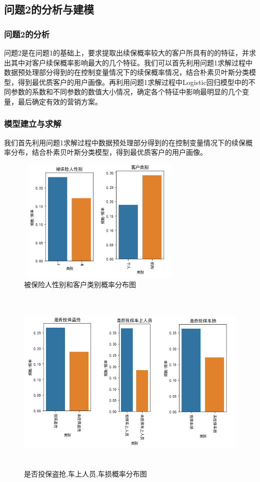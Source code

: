 \documentclass[UTF8,12pt,songti]{ctexart}
\begin{document}
\subsection{问题2的分析与建模}
\subsubsection{问题2的分析}
问题2是在问题1的基础上，要求提取出续保概率较大的客户所具有的的特征，并求出其中对客户续保概率影响最大的几个特征。我们可以首先利用问题1求解过程中数据预处理部分得到的在控制变量情况下的续保概率情况，结合朴素贝叶斯分类模型，得到最优质客户的用户画像。再利用问题1求解过程中Logistic回归模型中的不同参数的系数和不同参数的数值大小情况，确定各个特征中影响最明显的几个变量，最后确定有效的营销方案。
\subsubsection{模型建立与求解}
我们首先利用问题1求解过程中数据预处理部分得到的在控制变量情况下的续保概率分布，结合朴素贝叶斯分类模型，得到最优质客户的用户画像。\par
\begin{figure}[H]
\centering
\includegraphics[width=8cm,height=6cm]{4-2-2-1.png}
\caption{被保险人性别和客户类别概率分布图}
\end{figure}
\begin{figure}[H]
\centering
\includegraphics[width=12cm,height=9cm]{4-2-2-2.png}
\caption{是否投保盗抢,车上人员,车损概率分布图}
\end{figure}
\end{document}
